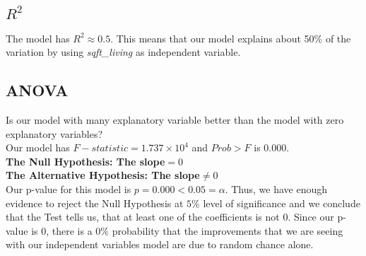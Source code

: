 \documentclass[10pt]{article}
\begin{document}
	\nopagebreak
\subsection*{\textbf{\(R^2 \)}}
The model has \(R^2\approx 0.5\).  This means that our model explains about 50\% of the variation by using {\it sqft\_living} as independent variable.
\subsection*{ANOVA}
Is our model with many explanatory variable better than the model with zero explanatory variables?\\
Our model has \(F-statistic = 1.737\times 10^4\)  and \(Prob > F\) is \(0.000\).\\
\textbf{The Null Hypothesis:   The slope\(=0\)\\
The Alternative Hypothesis: The slope\(\ne 0\)\\
}
Our p-value for this model is \(p=0.000 < 0.05 = \alpha\). Thus, we have enough evidence to reject the Null Hypothesis at $5\%$ level of significance and we conclude that the Test  tells us, that at least one of the coefficients is not $0$. Since our p-value is $0$, there is a $0\%$ probability that the improvements that we are seeing with our independent variables model are due to random chance alone.\textbf{}
\end{document}
